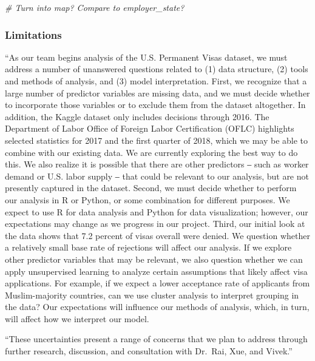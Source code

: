 \documentclass[]{article}
\newenvironment{Shaded}{\begin{snugshade}}{\end{snugshade}}
\newcommand{\CommentTok}[1]{\textcolor[rgb]{0.56,0.35,0.01}{\textit{#1}}}
\begin{document}
\begin{Shaded}
\begin{Highlighting}[]
\CommentTok{# Turn into map? Compare to employer_state? }
\end{Highlighting}
\end{Shaded}

\subsubsection{Limitations}\label{limitations}

``As our team begins analysis of the U.S. Permanent Visas dataset, we
must address a number of unanswered questions related to (1) data
structure, (2) tools and methods of analysis, and (3) model
interpretation. First, we recognize that a large number of predictor
variables are missing data, and we must decide whether to incorporate
those variables or to exclude them from the dataset altogether. In
addition, the Kaggle dataset only includes decisions through 2016. The
Department of Labor Office of Foreign Labor Certification (OFLC)
highlights selected statistics for 2017 and the first quarter of 2018,
which we may be able to combine with our existing data. We are currently
exploring the best way to do this. We also realize it is possible that
there are other predictors ‒ such as worker demand or U.S. labor supply
‒ that could be relevant to our analysis, but are not presently captured
in the dataset. Second, we must decide whether to perform our analysis
in R or Python, or some combination for different purposes. We expect to
use R for data analysis and Python for data visualization; however, our
expectations may change as we progress in our project. Third, our
initial look at the data shows that 7.2 percent of visas overall were
denied. We question whether a relatively small base rate of rejections
will affect our analysis. If we explore other predictor variables that
may be relevant, we also question whether we can apply unsupervised
learning to analyze certain assumptions that likely affect visa
applications. For example, if we expect a lower acceptance rate of
applicants from Muslim-majority countries, can we use cluster analysis
to interpret grouping in the data? Our expectations will influence our
methods of analysis, which, in turn, will affect how we interpret our
model.

``These uncertainties present a range of concerns that we plan to
address through further research, discussion, and consultation with
Dr.~Rai, Xue, and Vivek.''
\end{document}
